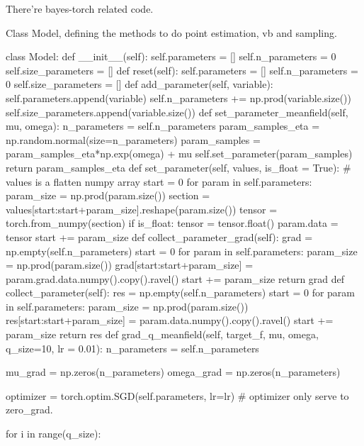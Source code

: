\documentclass{article}
\begin{document}
There're bayes-torch related code.

Class Model, defining the methods to do point estimation, vb and sampling.

\begin{python}

class Model:
    def __init__(self):
        self.parameters = []
        self.n_parameters = 0
        self.size_parameters = []
    def reset(self):
        self.parameters = []
        self.n_parameters = 0
        self.size_parameters = []
    def add_parameter(self, variable):
        self.parameters.append(variable)
        self.n_parameters += np.prod(variable.size())
        self.size_parameters.append(variable.size())
    def set_parameter_meanfield(self, mu, omega):
        n_parameters = self.n_parameters
        param_samples_eta = np.random.normal(size=n_parameters)
        param_samples = param_samples_eta*np.exp(omega) + mu
        self.set_parameter(param_samples)
        return param_samples_eta
    def set_parameter(self, values, is_float = True):
        # values is a flatten numpy array
        start = 0
        for param in self.parameters:
            param_size = np.prod(param.size())
            section = values[start:start+param_size].reshape(param.size())
            tensor = torch.from_numpy(section)
            if is_float:
                tensor = tensor.float()
            param.data = tensor
            start += param_size
    def collect_parameter_grad(self):
        grad = np.empty(self.n_parameters)
        start = 0
        for param in self.parameters:
            param_size = np.prod(param.size())
            grad[start:start+param_size] = param.grad.data.numpy().copy().ravel()
            start += param_size
        return grad
    def collect_parameter(self):
        res = np.empty(self.n_parameters)
        start = 0
        for param in self.parameters:
            param_size = np.prod(param.size())
            res[start:start+param_size] = param.data.numpy().copy().ravel()
            start += param_size
        return res
    def grad_q_meanfield(self, target_f, mu, omega, q_size=10, lr = 0.01):
        n_parameters = self.n_parameters
        
        mu_grad = np.zeros(n_parameters)
        omega_grad = np.zeros(n_parameters)
        
        optimizer = torch.optim.SGD(self.parameters, lr=lr)
        # optimizer only serve to zero_grad.
        
        for i in range(q_size):
            

\end{python}
\end{document}
